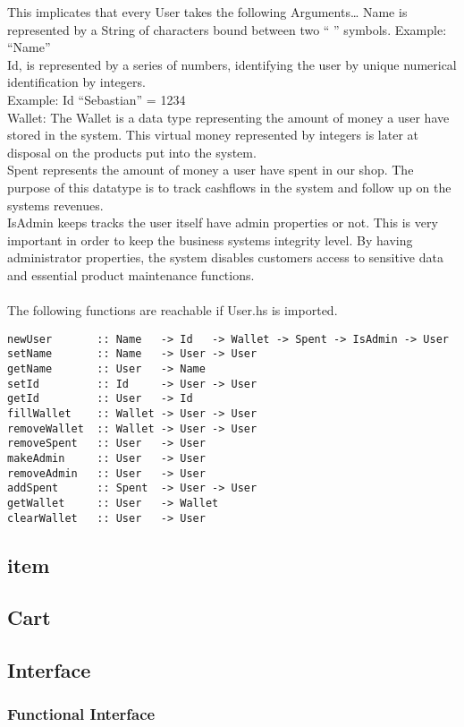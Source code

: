 \documentclass[11pt]{article}
\begin{document}
This implicates that every User takes the following Arguments…
Name is represented by a String of characters bound between two “ ” symbols.
Example: “Name”\\
Id, is represented by a series of numbers, identifying the user by unique numerical identification by integers.\\
Example: Id “Sebastian” = 1234\\
Wallet: The Wallet is a data type representing the amount of money a user have stored in the system. This virtual money represented by integers is later at disposal on the products put into the system.\\
Spent represents the amount of money a user have spent in our shop. The purpose of this datatype is to track cashflows in the system and follow up on the systems revenues.\\
IsAdmin keeps tracks the user itself have admin properties or not. This is very important in order to keep the business systems integrity level. By having administrator properties, the system disables customers access to sensitive data and essential product maintenance functions.\\\\
The following functions are reachable if User.hs is imported.
\begin{lstlisting}
newUser       :: Name   -> Id   -> Wallet -> Spent -> IsAdmin -> User
setName       :: Name   -> User -> User
getName       :: User   -> Name
setId         :: Id     -> User -> User
getId         :: User   -> Id
fillWallet    :: Wallet -> User -> User
removeWallet  :: Wallet -> User -> User
removeSpent   :: User   -> User
makeAdmin     :: User   -> User
removeAdmin   :: User   -> User
addSpent      :: Spent  -> User -> User
getWallet     :: User   -> Wallet
clearWallet   :: User   -> User
\end{lstlisting}

\subsection{item}
\subsection{Cart}
\subsection{Interface}
\subsubsection{Functional Interface}
\end{document}
